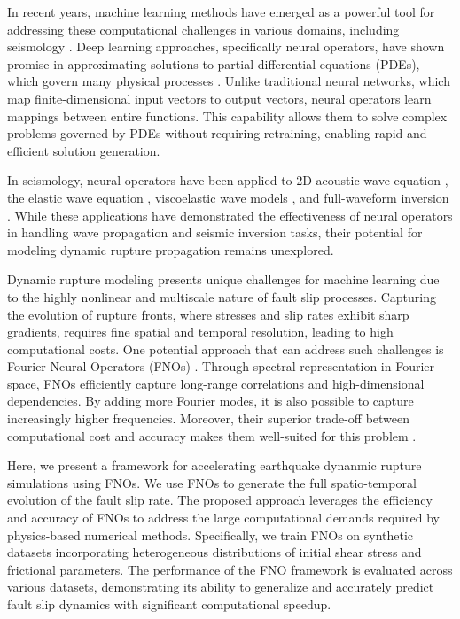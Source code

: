 \documentclass[draft]{agujournal2019}
\begin{document}
In recent years, machine learning methods have emerged as a powerful tool for addressing these computational challenges in various domains, including seismology \cite{zhu2019seismic, yang2022toward, zhu2019phasenet, mousavi2020earthquake, ross2018p, ross2019phaselink, zhu2022end}. Deep learning approaches, specifically neural operators, have shown promise in approximating solutions to partial differential equations (PDEs), which govern many physical processes \cite{kovachki2023neural, azizzadenesheli2024neural, rahman2022u}. Unlike traditional neural networks, which map finite-dimensional input vectors to output vectors, neural operators learn mappings between entire functions. This capability allows them to solve complex problems governed by PDEs without requiring retraining, enabling rapid and efficient solution generation. 

In seismology, neural operators have been applied to 2D acoustic wave equation \cite{li2023solving, yang2021seismic}, the elastic wave equation \cite{lehmann2023fourier, lehmann20243d, zou2024deep, zhang2023learning}, viscoelastic wave models \cite{wei2022small}, and full-waveform inversion \cite{yang2023rapid}. While these applications have demonstrated the effectiveness of neural operators in handling wave propagation and seismic inversion tasks, their potential for modeling dynamic rupture propagation remains unexplored.

Dynamic rupture modeling presents unique challenges for machine learning due to the highly nonlinear and multiscale nature of fault slip processes. Capturing the evolution of rupture fronts, where stresses and slip rates exhibit sharp gradients, requires fine spatial and temporal resolution, leading to high computational costs. One potential approach that can address such challenges is Fourier Neural Operators (FNOs) \cite{li2020fourier}. Through spectral representation in Fourier space, FNOs efficiently capture long-range correlations and high-dimensional dependencies. By adding more Fourier modes, it is also possible to capture increasingly higher frequencies. Moreover, their superior trade-off between computational cost and accuracy makes them well-suited for this problem \cite{de2022cost}.

Here, we present a framework for accelerating earthquake dynanmic rupture simulations using FNOs. We use FNOs to generate the full spatio-temporal evolution of the fault slip rate. The proposed approach leverages the efficiency and accuracy of FNOs to address the large computational demands required by physics-based numerical methods. Specifically, we train FNOs on synthetic datasets incorporating heterogeneous distributions of initial shear stress and frictional parameters. The performance of the FNO framework is evaluated across various datasets, demonstrating its ability to generalize and accurately predict fault slip dynamics with significant computational speedup.
\end{document}
